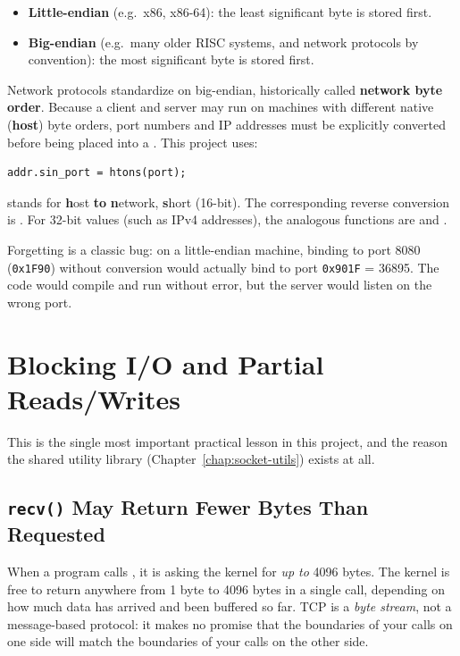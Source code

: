 \begin{itemize}
    \item \textbf{Little-endian} (e.g.\ x86, x86-64): the least significant byte is stored first.
    \item \textbf{Big-endian} (e.g.\ many older RISC systems, and network protocols by convention): the most significant byte is stored first.
\end{itemize}

Network protocols standardize on big-endian, historically called \textbf{network byte order}. Because a client and server may run on machines with different native (\textbf{host}) byte orders, port numbers and IP addresses must be explicitly converted before being placed into a . This project uses:

\begin{lstlisting}[style=cstyle]
addr.sin_port = htons(port);
\end{lstlisting}

 stands for \textbf{h}ost \textbf{to} \textbf{n}etwork, \textbf{s}hort (16-bit). The corresponding reverse conversion is . For 32-bit values (such as IPv4 addresses), the analogous functions are  and .

\begin{warnbox}
Forgetting  is a classic bug: on a little-endian machine, binding to port 8080 (\texttt{0x1F90}) without conversion would actually bind to port \texttt{0x901F} = 36895. The code would compile and run without error, but the server would listen on the wrong port.
\end{warnbox}

\section{Blocking I/O and Partial Reads/Writes}
\label{sec:partial-io}

This is the single most important practical lesson in this project, and the reason the shared utility library (Chapter~\ref{chap:socket-utils}) exists at all.

\subsection{\texttt{recv()} May Return Fewer Bytes Than Requested}

When a program calls , it is asking the kernel for \emph{up to} 4096 bytes. The kernel is free to return anywhere from 1 byte to 4096 bytes in a single call, depending on how much data has arrived and been buffered so far. TCP is a \emph{byte stream}, not a message-based protocol: it makes no promise that the boundaries of your  calls on one side will match the boundaries of your  calls on the other side.

